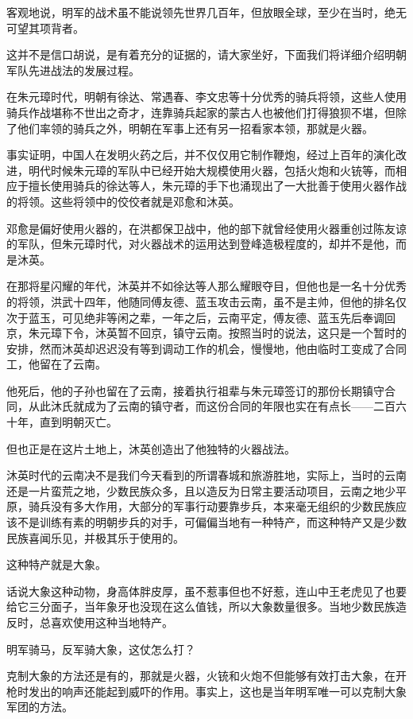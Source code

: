 \begin{multicols}{\theparacolNo}
客观地说，明军的战术虽不能说领先世界几百年，但放眼全球，至少在当时，绝无可望其项背者。

这并不是信口胡说，是有着充分的证据的，请大家坐好，下面我们将详细介绍明朝军队先进战法的发展过程。

在朱元璋时代，明朝有徐达、常遇春、李文忠等十分优秀的骑兵将领，这些人使用骑兵作战堪称不世出之奇才，连靠骑兵起家的蒙古人也被他们打得狼狈不堪，但除了他们率领的骑兵之外，明朝在军事上还有另一招看家本领，那就是火器。

事实证明，中国人在发明火药之后，并不仅仅用它制作鞭炮，经过上百年的演化改进，明代时候朱元璋的军队中已经开始大规模使用火器，包括火炮和火铳等，而相应于擅长使用骑兵的徐达等人，朱元璋的手下也涌现出了一大批善于使用火器作战的将领。这些将领中的佼佼者就是邓愈和沐英。

邓愈是偏好使用火器的，在洪都保卫战中，他的部下就曾经使用火器重创过陈友谅的军队，但朱元璋时代，对火器战术的运用达到登峰造极程度的，却并不是他，而是沐英。

在那将星闪耀的年代，沐英并不如徐达等人那么耀眼夺目，但他也是一名十分优秀的将领，洪武十四年，他随同傅友德、蓝玉攻击云南，虽不是主帅，但他的排名仅次于蓝玉，可见绝非等闲之辈，一年之后，云南平定，傅友德、蓝玉先后奉调回京，朱元璋下令，沐英暂不回京，镇守云南。按照当时的说法，这只是一个暂时的安排，然而沐英却迟迟没有等到调动工作的机会，慢慢地，他由临时工变成了合同工，他留在了云南。

他死后，他的子孙也留在了云南，接着执行祖辈与朱元璋签订的那份长期镇守合同，从此沐氏就成为了云南的镇守者，而这份合同的年限也实在有点长——二百六十年，直到明朝灭亡。

但也正是在这片土地上，沐英创造出了他独特的火器战法。

沐英时代的云南决不是我们今天看到的所谓春城和旅游胜地，实际上，当时的云南还是一片蛮荒之地，少数民族众多，且以造反为日常主要活动项目，云南之地少平原，骑兵没有多大作用，大部分的军事行动要靠步兵，本来毫无组织的少数民族应该不是训练有素的明朝步兵的对手，可偏偏当地有一种特产，而这种特产又是少数民族喜闻乐见，并极其乐于使用的。

这种特产就是大象。

话说大象这种动物，身高体胖皮厚，虽不惹事但也不好惹，连山中王老虎见了也要给它三分面子，当年象牙也没现在这么值钱，所以大象数量很多。当地少数民族造反时，总喜欢使用这种当地特产。

明军骑马，反军骑大象，这仗怎么打？

克制大象的方法还是有的，那就是火器，火铳和火炮不但能够有效打击大象，在开枪时发出的响声还能起到威吓的作用。事实上，这也是当年明军唯一可以克制大象军团的方法。


\end{multicols}
